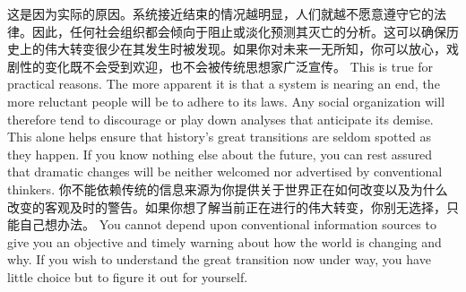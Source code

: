 \begin{paracol}{2}
\switchcolumn*
这是因为实际的原因。系统接近结束的情况越明显，人们就越不愿意遵守它的法律。因此，任何社会组织都会倾向于阻止或淡化预测其灭亡的分析。这可以确保历史上的伟大转变很少在其发生时被发现。如果你对未来一无所知，你可以放心，戏剧性的变化既不会受到欢迎，也不会被传统思想家广泛宣传。
\switchcolumn
This is true for practical reasons. The more apparent it is that a system is nearing an end, the more reluctant people will be to adhere to its laws. Any social organization will therefore tend to discourage or play down analyses that anticipate its demise. This alone helps ensure that history's great transitions are seldom spotted as they happen. If you know nothing else about the future, you can rest assured that dramatic changes will be neither welcomed nor advertised by conventional thinkers.
\switchcolumn*
你不能依赖传统的信息来源为你提供关于世界正在如何改变以及为什么改变的客观及时的警告。如果你想了解当前正在进行的伟大转变，你别无选择，只能自己想办法。
\switchcolumn
You cannot depend upon conventional information sources to give you an objective and timely warning about how the world is changing and why. If you wish to understand the great transition now under way, you have little choice but to figure it out for yourself.  
\end{paracol}

